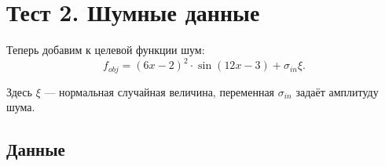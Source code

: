\documentclass[11pt,a4paper]{article}
\begin{document}

    \hypertarget{ux442ux435ux441ux442-2.-ux448ux443ux43cux43dux44bux435-ux434ux430ux43dux43dux44bux435}{%
\section{Тест 2. Шумные
данные}\label{ux442ux435ux441ux442-2.-ux448ux443ux43cux43dux44bux435-ux434ux430ux43dux43dux44bux435}}

    Теперь добавим к целевой функции шум: \[
  f_{obj} = (6x-2)^2 \cdot \sin\left(12x-3\right) + \sigma_{in} \xi.
\]

Здесь \(\xi\) --- нормальная случайная величина, переменная
\(\sigma_{in}\) задаёт амплитуду шума.

    \hypertarget{ux434ux430ux43dux43dux44bux435}{%
\subsection{Данные}\label{ux434ux430ux43dux43dux44bux435}}
\end{document}
